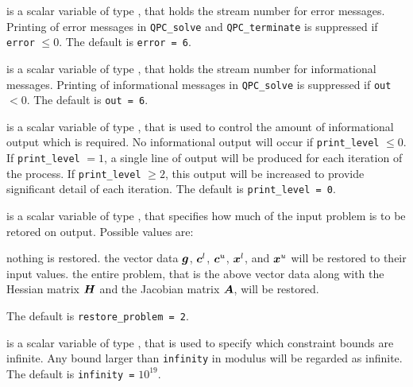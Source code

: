 \documentclass{galahad}
\newcommand{\packagename}{QPC}
\begin{document}
\begin{description}

 is a scalar variable of type \integer, that holds the
stream number for error messages. Printing of error messages in 
{\tt \packagename\_solve} and {\tt \packagename\_terminate} 
is suppressed if {\tt error} $\leq 0$.
The default is {\tt error = 6}.

 is a scalar variable of type \integer, that holds the
stream number for informational messages. Printing of informational messages in 
{\tt \packagename\_solve} is suppressed if {\tt out} $< 0$.
The default is {\tt out = 6}.

 is a scalar variable of type \integer, that is used
to control the amount of informational output which is required. No 
informational output will occur if {\tt print\_level} $\leq 0$. If 
{\tt print\_level} $= 1$, a single line of output will be produced for each
iteration of the process. If {\tt print\_level} $\geq 2$, this output will be
increased to provide significant detail of each iteration.
The default is {\tt print\_level = 0}.



 is a scalar variable of type \integer, that 
specifies how much of the input problem is to be retored on output. 
Possible values are:
\begin{description}
 nothing is restored. 
 the vector data ${\bm{g}}$, 
   ${\bm{c}}^{l}$, ${\bm{c}}^{u}$, ${\bm{x}}^{l}$, and ${\bm{x}}^{u}$ 
   will be restored to their input values.
 the entire problem, that is the above vector data along with 
the Hessian matrix ${\bm{H}}$ and the Jacobian matrix ${\bm{A}}$, will be restored.
\end{description}
The default is {\tt restore\_problem = 2}.

 is a scalar variable of type \realdp, that is used to
specify which constraint bounds are infinite.
Any bound larger than {\tt infinity} in modulus will be regarded as infinite.
The default is {\tt infinity =} $10^{19}$.


\end{description}
\end{document}

